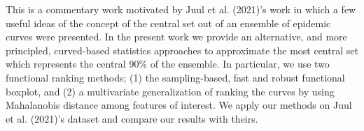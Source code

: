 \documentclass[12pt]{article}
\begin{document}
This is a commentary work motivated by Juul et al. (2021)’s work in which a few useful ideas
of the concept of the central set out of an ensemble of epidemic curves were presented. In the present work we provide an alternative, and more principled, curved-based statistics approaches to approximate the most central set which represents the central 90\% of the ensemble. In particular, we use two functional ranking methods; (1) the sampling-based, fast and robust functional boxplot, and (2) a multivariate generalization of ranking the curves by using Mahalanobis distance among features of interest. We apply our methods on Juul et al. (2021)’s dataset and compare our results with theirs.
\end{document}
